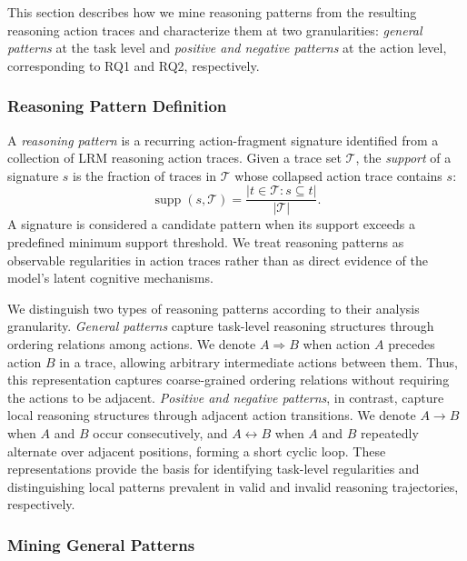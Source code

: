 \documentclass[acmsmall,screen,review,anonymous]{acmart}
\begin{document}
This section describes how we mine reasoning patterns from the resulting reasoning action traces and characterize them at two granularities: \textit{general patterns} at the task level and \textit{positive and negative patterns} at the action level, corresponding to RQ1 and RQ2, respectively.

\subsubsection{\textbf{Reasoning Pattern Definition}}

A \textit{reasoning pattern} is a recurring action-fragment signature identified from a collection of LRM reasoning action traces. Given a trace set \(\mathcal{T}\), the \emph{support} of a signature \(s\) is the fraction of traces in \(\mathcal{T}\) whose collapsed action trace contains \(s\):
\begin{equation}
\operatorname{supp}(s,\mathcal{T}) =
\frac{|{t\in\mathcal{T}: s\subseteq t}|}{|\mathcal{T}|}.
\end{equation}
A signature is considered a candidate pattern when its support exceeds a predefined minimum support threshold. We treat reasoning patterns as observable regularities in action traces rather than as direct evidence of the model's latent cognitive mechanisms.

We distinguish two types of reasoning patterns according to their analysis granularity. \emph{General patterns} capture task-level reasoning structures through ordering relations among actions. We denote \(A\Rightarrow B\) when action \(A\) precedes action \(B\) in a trace, allowing arbitrary intermediate actions between them. Thus, this representation captures coarse-grained ordering relations without requiring the actions to be adjacent. 
\emph{Positive and negative patterns}, in contrast, capture local reasoning structures through adjacent action transitions. We denote \(A\rightarrow B\) when \(A\) and \(B\) occur consecutively, and \(A\leftrightarrow B\) when \(A\) and \(B\) repeatedly alternate over adjacent positions, forming a short cyclic loop. These representations provide the basis for identifying task-level regularities and distinguishing local patterns prevalent in valid and invalid reasoning trajectories, respectively.

\subsubsection{\textbf{Mining General Patterns}}
\label{sec:general-pattern-discovery}
\end{document}
